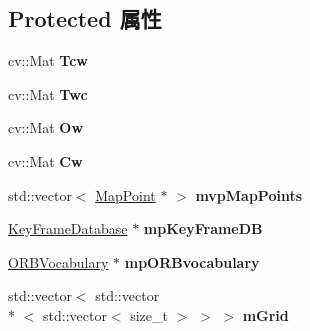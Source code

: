 \subsection*{Protected 属性}
\begin{DoxyCompactItemize}
\item 
\hypertarget{classORB__SLAM2_1_1KeyFrame_a8dc31ef9a08d34ecb196f3e58a2c09b9}{cv\-::\-Mat {\bfseries Tcw}}\label{classORB__SLAM2_1_1KeyFrame_a8dc31ef9a08d34ecb196f3e58a2c09b9}

\item 
\hypertarget{classORB__SLAM2_1_1KeyFrame_a769de03e37e9531ab43625250287ff8c}{cv\-::\-Mat {\bfseries Twc}}\label{classORB__SLAM2_1_1KeyFrame_a769de03e37e9531ab43625250287ff8c}

\item 
\hypertarget{classORB__SLAM2_1_1KeyFrame_a3044f098f2b7d25b33b180b20c5a5fa6}{cv\-::\-Mat {\bfseries Ow}}\label{classORB__SLAM2_1_1KeyFrame_a3044f098f2b7d25b33b180b20c5a5fa6}

\item 
\hypertarget{classORB__SLAM2_1_1KeyFrame_a4666bde848e4fbabf327e5ec0804e80e}{cv\-::\-Mat {\bfseries Cw}}\label{classORB__SLAM2_1_1KeyFrame_a4666bde848e4fbabf327e5ec0804e80e}

\item 
\hypertarget{classORB__SLAM2_1_1KeyFrame_a777aab9cb7c1fd8e83f143e77a9f1b03}{std\-::vector$<$ \hyperlink{classORB__SLAM2_1_1MapPoint}{Map\-Point} $\ast$ $>$ {\bfseries mvp\-Map\-Points}}\label{classORB__SLAM2_1_1KeyFrame_a777aab9cb7c1fd8e83f143e77a9f1b03}

\item 
\hypertarget{classORB__SLAM2_1_1KeyFrame_a0d0f82c40703deb82fbc593d9e17ea1a}{\hyperlink{classORB__SLAM2_1_1KeyFrameDatabase}{Key\-Frame\-Database} $\ast$ {\bfseries mp\-Key\-Frame\-D\-B}}\label{classORB__SLAM2_1_1KeyFrame_a0d0f82c40703deb82fbc593d9e17ea1a}

\item 
\hypertarget{classORB__SLAM2_1_1KeyFrame_ab268c7bd221fb11554a9f21f56a5550a}{\hyperlink{classDBoW2_1_1TemplatedVocabulary}{O\-R\-B\-Vocabulary} $\ast$ {\bfseries mp\-O\-R\-Bvocabulary}}\label{classORB__SLAM2_1_1KeyFrame_ab268c7bd221fb11554a9f21f56a5550a}

\item 
\hypertarget{classORB__SLAM2_1_1KeyFrame_aa01e44ecc9b907b3f85094d84de08cb8}{std\-::vector$<$ std\-::vector\\*
$<$ std\-::vector$<$ size\-\_\-t $>$ $>$ $>$ {\bfseries m\-Grid}}\label{classORB__SLAM2_1_1KeyFrame_aa01e44ecc9b907b3f85094d84de08cb8}


\end{DoxyCompactItemize}
